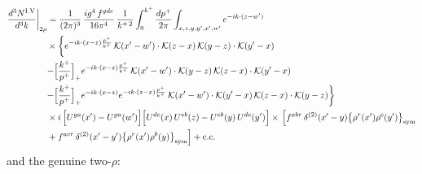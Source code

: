 \documentclass[9pt]{article}
\numberwithin{equation}{section}
\begin{document}
\begin{align}
\frac{d^{3}N^{\rm I.V}}{d^{3}k}\bigg|_{2\rho}&=\frac{1}{(2\pi)^{3}}\,\frac{ig^{4}\,f^{gde}}{16\pi^{4}}\,\frac{1}{k^{+\,2}}\int_{0}^{k^{+}}\frac{dp^{+}}{2\pi}\int_{x,z,y,y',x',w'}e^{-ik\cdot{(z-w')}}\notag\\
&\times\bigg\{e^{-ik\cdot{(x-z)}\frac{p^{+}}{k^{+}}}\,\mathcal{K}(x'-w')\cdot\mathcal{K}(z-x)\,\mathcal{K}(y-z)\cdot\mathcal{K}(y'-x)\notag\\
&{-\Big[\frac{k^{+}}{p^{+}}\Big]_{+}e^{-ik\cdot{(x-z)}\frac{p^{+}}{k^{+}}}\,\mathcal{K}(x'-w')\cdot\mathcal{K}(y-z)\,\mathcal{K}(z-x)\cdot\mathcal{K}(y'-x)}\notag\\
&{-\Big[\frac{k^{+}}{p^{+}}\Big]_{+}e^{-ik\cdot{(x-z)}}e^{-ik\cdot{(z-x)}\frac{p^{+}}{k^{+}}}\,\mathcal{K}(x'-w')\cdot\mathcal{K}(y'-x)\,\mathcal{K}(z-x)\cdot\mathcal{K}(y-z)}\bigg\}\notag\\
&\times i\,\Big[U^{ga}(x')-U^{ga}(w')\Big]\Big[U^{dc}(x)\,U^{eb}(z)-U^{eb}(y)\,U^{dc}(y')\Big]\times\,\Big[f^{abr}\,\delta^{(2)}(x'-y)\big\{\rho^{r}(x')\rho^{c}(y')\big\}_{\rm sym}\notag\\
& +f^{acr}\,\delta^{(2)}(x'-y')\big\{\rho^{r}(x')\rho^{b}(y)\big\}_{\rm sym}\Big]+{\rm c.c.}\label{eq:D-I.V-2}
\end{align}
and the genuine two-$\rho$:
\end{document}
